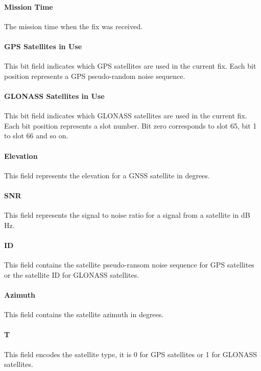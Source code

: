 \paragraph{Mission Time}
The mission time when the fix was received.

\paragraph{GPS Satellites in Use}

This bit field indicates which GPS satellites are used in the current fix. Each bit position represents a GPS
pseudo-random noise sequence.

\paragraph{GLONASS Satellites in Use}
This bit field indicates which GLONASS satellites are used in the current fix. Each bit position represents a slot
number. Bit zero corresponds to slot 65, bit 1 to slot 66 and so on.

\paragraph{Elevation}
This field represents the elevation for a GNSS satellite in degrees.

\paragraph{SNR}
This field represents the signal to noise ratio for a signal from a satellite in dB Hz.

\paragraph{ID}
This field contains the satellite pseudo-ransom noise sequence for GPS satellites or the satellite ID for GLONASS
satellites.

\paragraph{Azimuth}
This field contains the satellite azimuth in degrees.

\paragraph{T}
This field encodes the satellite type, it is 0 for GPS satellites or 1 for GLONASS satellites.

